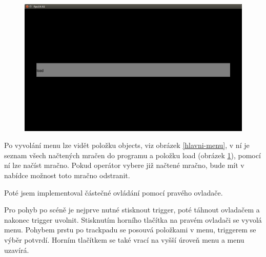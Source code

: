 \begin{figure}
	\centering
	\includegraphics[keepaspectratio,width=\textwidth]{obrazky/prazdne-objekty}
	\label{objects}
\end{figure}

Po vyvolání menu lze vidět položku objects, viz obrázek \ref{hlavni-menu}, v ní je seznam všech načtených mračen do programu a položku load (obrázek \ref{objects}), pomocí ní lze načíst mračno. Pokud operátor vybere již načtené mračno, bude mít v nabídce možnost toto mračno odstranit.

Poté jsem implementoval částečné ovládání pomocí pravého ovladače.

Pro pohyb po scéně je nejprve nutné stisknout trigger, poté táhnout ovladačem a nakonec trigger uvolnit. Stisknutím horního tlačítka na pravém ovladači se vyvolá menu. Pohybem prstu po trackpadu se posouvá položkami v menu, triggerem se výběr potvrdí. Horním tlačítkem se také vrací na vyšší úroveň menu a menu uzavírá.


